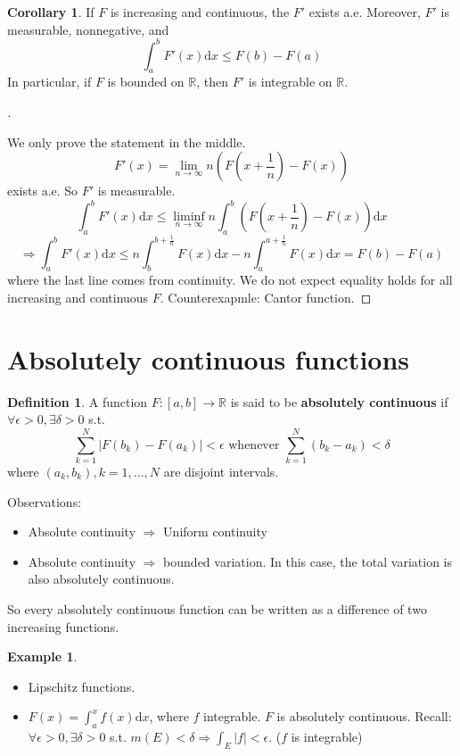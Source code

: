 \documentclass{article}
\theoremstyle{definition}
\theoremstyle{definition}
\newtheorem{ex}{Example}
\newtheorem{dfn}{Definition}
\newtheorem{cor}{Corollary}
\newenvironment{proofs}[1][\proofname]{%
  \begin{proof}[#1]$ $\par\nobreak\ignorespaces
}{%
  \end{proof}
}
\begin{document}
\begin{cor}
  If $F$ is increasing and continuous, the $F'$ exists a.e. Moreover, $F'$ is measurable, nonnegative, and 
  \[
    \int_a^b F'(x) \mathrm{d} x \leq F(b) - F(a)
  \]
  In particular, if $F$ is bounded on $\mathbb{R}$, then $F'$ is integrable on $\mathbb{R}$. 
\end{cor}

\begin{proofs}
  We only prove the statement in the middle. 
  \[
    F'(x) = \lim_{n \to \infty} n (F(x +  \frac{1}{n}) - F(x))
  \]
  exists a.e. So $F'$ is measurable. 
  \[
    \int_a^b F'(x) \mathrm{d}x \leq \liminf_{n \to \infty} n\int_a^b (F(x + \frac{1}{n}) - F(x)) \mathrm{d} x
  \]
  \[
    \Rightarrow \int_a^b F'(x) \mathrm{d}x \leq n \int_b^{b + \frac{1}{n}} F(x) \mathrm{d} x - n \int_a^{a + \frac{1}{n}} F(x) \mathrm{d} x = F(b) - F(a)
  \]
  where the last line comes from continuity. We do not expect equality holds for all increasing and continuous $F$. Counterexapmle: Cantor function. 

\end{proofs}

\section{Absolutely continuous functions}

\begin{dfn}
	A function $F:[a, b] \to \mathbb{R}$ is said to be \textbf{absolutely continuous} if $\forall \epsilon > 0, \exists \delta > 0$ s.t.
  \[
    \sum_{k =1}^N |F(b_k ) - F(a_k)| < \epsilon \text{ whenever } \sum_{k = 1}^N (b_k - a_k) < \delta
  \]
  where $(a_k, b_k), k = 1, ..., N$ are disjoint intervals. 
\end{dfn}

Observations:

\begin{itemize}
  \item Absolute continuity $\Rightarrow$ Uniform continuity
  \item Absolute continuity $\Rightarrow$ bounded variation. In this case, the total variation is also absolutely continuous. 
\end{itemize}

So every absolutely continuous function can be written as a difference of two increasing functions. 

\begin{ex}
  
  \begin{itemize}
    \item Lipschitz functions.
    \item $F(x) = \int_a^x f(x) \mathrm{d} x$, where $f$ integrable. $F$ is absolutely continuous. Recall: $\forall \epsilon > 0, \exists \delta > 0$ s.t. $m(E) < \delta \Rightarrow \int_E |f| < \epsilon$. ($f$ is integrable) 
  \end{itemize}

\end{ex}
\end{document}
